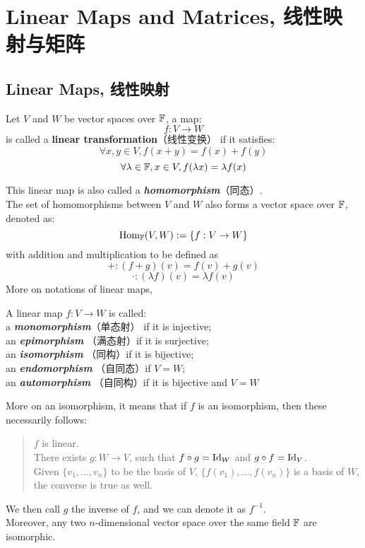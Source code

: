 \section{Linear Maps and Matrices, 线性映射与矩阵}
\subsection{Linear Maps, 线性映射}
\begin{definition}
    Let $V$ and $W$ be vector spaces over $\mathbb{F}$, a map:
    $$f: V \to W$$
    is called a \textbf{\textbf{linear transformation}}（线性变换） if it satisfies:
    $$\forall x, y \in V, f(x+y) = f(x) + f(y)$$
    $$\forall \lambda \in \mathbb{F}, x \in V, f(\lambda x) = \lambda f(x)$$
\end{definition}
This linear map is also called a \textbf{\textit{homomorphism}}（同态）. \\
The set of homomorphisms between $V$ and $W$ also forms a vector space over $\mathbb{F}$, denoted as:
$$\text{Hom}_{\mathbb{F}}(V, W):=\{f: V \to W\}$$
with addition and multiplication to be defined as
$$+: (f+g)(v) = f(v) + g(v)$$
$$\cdot: (\lambda f)(v) = \lambda f(v)$$
More on notations of linear maps,
\begin{definition}
    A linear map $f: V \to W$ is called: \\
    a \textbf{\textit{monomorphism}}（单态射） if it is injective; \\
    an \textbf{\textit{epimorphism}} （满态射）if it is surjective; \\
    an \textbf{\textit{isomorphism}} （同构）if it is bijective; \\
    an \textbf{\textit{endomorphism}} （自同态）if $V = W$; \\
    an \textbf{\textit{automorphism}} （自同构）if it is bijective and $V = W$
\end{definition}
More on an isomorphism, it means that if $f$ is an isomorphism, then these necessarily follows:
\begin{quote}
    $f$ is linear. \\
    There exists $g:W \to V$, such that $f \circ g = \text{Id}_W$ and $g \circ f = \text{Id}_V$. \\
    Given $\{v_1,\dots,v_n\}$ to be the basis of $V$, $\{f(v_1),\dots,f(v_n)\}$ is a basis of $W$, the converse is true as well.
\end{quote}
We then call $g$ the inverse of $f$, and we can denote it as $f^{-1}$. \\
Moreover, any two $n$-dimensional vector space over the same field $\mathbb{F}$ are isomorphic. \\
